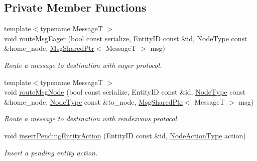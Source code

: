 \subsection*{Private Member Functions}
\begin{DoxyCompactItemize}
\item 
{\footnotesize template$<$typename MessageT $>$ }\\void \hyperlink{structvt_1_1location_1_1_entity_location_coord_a9a3ec50bdff21105fb66624264bfcd01}{route\+Msg\+Eager} (bool const serialize, Entity\+ID const \&id, \hyperlink{namespacevt_a866da9d0efc19c0a1ce79e9e492f47e2}{Node\+Type} const \&home\+\_\+node, \hyperlink{namespacevt_ab2b3d506ec8e8d1540aede826d84a239}{Msg\+Shared\+Ptr}$<$ MessageT $>$ msg)
\begin{DoxyCompactList}\small\item\em Route a message to destination with eager protocol. \end{DoxyCompactList}\item 
{\footnotesize template$<$typename MessageT $>$ }\\void \hyperlink{structvt_1_1location_1_1_entity_location_coord_a96002b606b582ad27866e86c88b7a93f}{route\+Msg\+Node} (bool const serialize, Entity\+ID const \&id, \hyperlink{namespacevt_a866da9d0efc19c0a1ce79e9e492f47e2}{Node\+Type} const \&home\+\_\+node, \hyperlink{namespacevt_a866da9d0efc19c0a1ce79e9e492f47e2}{Node\+Type} const \&to\+\_\+node, \hyperlink{namespacevt_ab2b3d506ec8e8d1540aede826d84a239}{Msg\+Shared\+Ptr}$<$ MessageT $>$ msg)
\begin{DoxyCompactList}\small\item\em Route a message to destination with rendezvous protocol. \end{DoxyCompactList}\item 
void \hyperlink{structvt_1_1location_1_1_entity_location_coord_a2b2c69634e3ef42e2625541cd234b350}{insert\+Pending\+Entity\+Action} (Entity\+ID const \&id, \hyperlink{namespacevt_1_1location_a3a9235e0ceb341bef225d2cc46606e9e}{Node\+Action\+Type} action)
\begin{DoxyCompactList}\small\item\em Insert a pending entity action. \end{DoxyCompactList}\end{DoxyCompactItemize}
